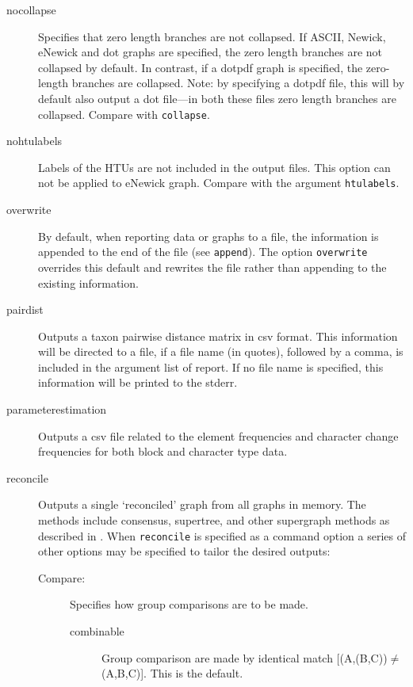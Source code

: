 \begin{description}
		\item[nocollapse] Specifies that zero length branches are not collapsed.
		If ASCII, Newick, eNewick and dot graphs are specified, the zero length 
		branches are not collapsed by default. In contrast, if a dotpdf graph is 
		specified, the zero-length branches are collapsed. Note: by specifying 
		a dotpdf file, this will by default also output a dot file---in both these files 
		zero length branches are collapsed. Compare with \texttt{collapse}. 
				
		\item[nohtulabels] Labels of the HTUs are not included in the output files. 
		This option can not be applied to eNewick graph. Compare with the argument 
		\texttt{htulabels}.
		
		\item[overwrite] By default, when reporting data or graphs to a file, the 
		information is appended to the end of the file (see \texttt{append}). The 
		option \texttt{overwrite} overrides this default and rewrites the file rather 
		than appending to the existing information.

		\item[pairdist] Outputs a taxon pairwise distance matrix in csv format. 
		This information will be directed to a file, if a file name (in quotes), followed 
		by a comma, is included in the argument list of report. If no file name is 
		specified, this information will be printed to the stderr.
		
		\item[parameterestimation] Outputs a csv file related to the element
		frequencies and character change frequencies for both block and character
		type data.
		
		\item[reconcile] Outputs a single `reconciled' graph from all graphs in 
		memory. The methods include consensus, supertree, and other supergraph 
		methods as described in \cite{Wheeler2012, Wheeler2022}. When \texttt{reconcile} 
		is specified as a command option a series of other options may be specified 
		to tailor the desired outputs:
		
		\begin{description}
		
			\item [Compare:] Specifies how group comparisons are to be made.
						
			\begin{description}
				\item[combinable] Group comparison are made by identical match 
				[(A,(B,C))$\neq$(A,B,C)]. This is the default.	
								

\end{description}
\end{description}
\end{description}
